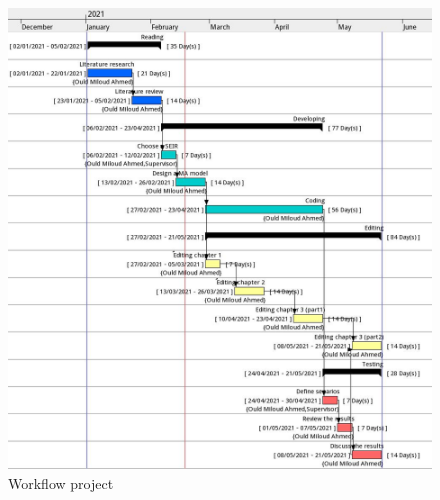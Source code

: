 \documentclass[paper=a4, fontsize=11.5pt]{scrartcl}
\numberwithin{equation}{section}		%
\numberwithin{figure}{section}			%
\numberwithin{table}{section}				%
\begin{document}
\begin{figure}[!h]
	\centering
	\includegraphics [width=1.15\linewidth]{ Figs/Workflow.png}
	\caption{Workflow project}
	\label{Figure2}
\end{figure}
\pagebreak


\end{document}
